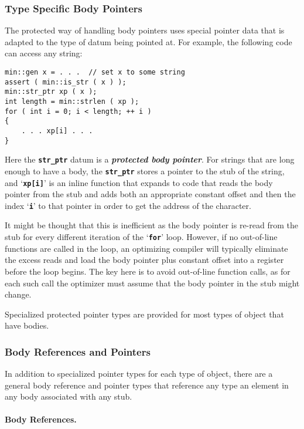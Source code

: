 \documentclass[12pt]{article}
\newcommand{\subsubsubsection}[1]{\paragraph[#1]{#1.}}
\newcommand{\TT}[1]{{\tt \bfseries #1}}
\newcommand{\key}[1]{{\bf \em #1}\index{#1}}
\newenvironment{indpar}[1][0.3in]%
	{\begin{list}{}%
		     {\setlength{\itemsep}{0in}%
		      \setlength{\topsep}{0in}%
		      \setlength{\parsep}{1ex}%
		      \setlength{\labelwidth}{#1}%
		      \setlength{\leftmargin}{#1}%
		      \addtolength{\leftmargin}{\labelsep}}%
	 \item}%
	{\end{list}}
\begin{document}
\subsubsection{Type Specific Body Pointers}
\label{TYPE-SPECIFIC-BODY-POINTERS}

The protected way of handling body pointers
uses special pointer data that is adapted to
the type of datum being pointed at.  For example, the following
code can access any string:
\begin{indpar}\begin{verbatim}
min::gen x = . . .  // set x to some string
assert ( min::is_str ( x ) );
min::str_ptr xp ( x );
int length = min::strlen ( xp );
for ( int i = 0; i < length; ++ i )
{
    . . . xp[i] . . .
}
\end{verbatim}\end{indpar}

Here the \TT{str\_ptr} datum is a \key{protected body pointer}.
For strings that are long enough to have a body, the
\TT{str\_ptr} stores a pointer to the stub of the string,
and `\TT{xp[i]}' is an inline function that expands to
code that reads the body pointer from the stub and adds both
an appropriate constant offset and then the index `\TT{i}'
to that pointer in order to get the address of the character.

It might be thought that this is inefficient as the body pointer
is re-read from the stub for every different iteration of the `\TT{for}'
loop.  However, if no out-of-line functions are called in the
loop, an optimizing compiler will typically eliminate
the excess reads and load the body pointer plus constant offset
into a register before the loop begins.  The key here is to
avoid out-of-line function calls, as for each such call the
optimizer must assume that the body pointer in the stub might
change.

Specialized protected pointer types are provided for most types of object
that have bodies.

\subsubsection{Body References and Pointers}
\label{BODY-REFERENCES-AND-POINTERS}

In addition to specialized pointer types for each type of object,
there are a general body reference and pointer types
that reference any type an element in any body associated with any stub.

\subsubsubsection{Body References}
\label{BODY-REFERENCES}
\end{document}
